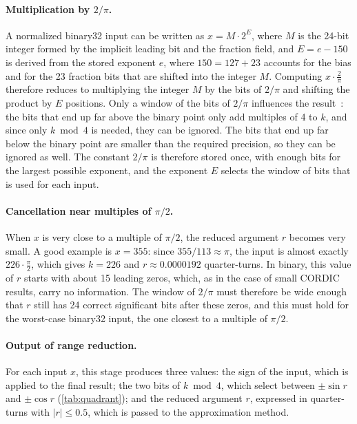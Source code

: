 \paragraph{Multiplication by $2/\pi$.}
A normalized binary32 input can be written as $x = M \cdot 2^{E}$, where $M$
is the 24-bit integer formed by the implicit leading bit and the fraction
field, and $E = e - 150$ is derived from the stored exponent $e$, where
$150 = 127 + 23$ accounts for the bias and for the 23 fraction bits that are
shifted into the integer $M$.
Computing $x \cdot \frac{2}{\pi}$ therefore reduces to multiplying the integer $M$ by
the bits of $2/\pi$ and shifting the product by $E$ positions. Only a window
of the bits of $2/\pi$ influences the result~\cite{ly2026payne}: the bits
that end up far above the binary point only add multiples of 4 to $k$, and
since only $k \bmod 4$ is needed, they can be ignored.
The bits that end up far below the binary point are smaller than the required precision, so they
can be ignored as well. The constant $2/\pi$ is therefore stored once, with
enough bits for the largest possible exponent, and the exponent $E$ selects
the window of bits that is used for each input.

\paragraph{Cancellation near multiples of $\pi/2$.}
When $x$ is very close to a multiple of $\pi/2$, the reduced argument $r$
becomes very small. A good example is $x = 355$: since
$355/113 \approx \pi$, the input is almost exactly $226 \cdot \frac{\pi}{2}$,
which gives $k = 226$ and $r \approx 0.0000192$ quarter-turns. In binary,
this value of $r$ starts with about 15 leading zeros, which, as in the case
of small CORDIC results, carry no information. The window of $2/\pi$ must
therefore be wide enough that $r$ still has 24 correct significant bits after
these zeros, and this must hold for the worst-case binary32 input, the one
closest to a multiple of $\pi/2$.

\paragraph{Output of range reduction.}
For each input $x$, this stage produces three values: the sign of the input,
which is applied to the final result; the two bits of $k \bmod 4$, which
select between $\pm\sin r$ and $\pm\cos r$ (\cref{tab:quadrant}); and the
reduced argument $r$, expressed in quarter-turns with $|r| \le 0.5$, which is
passed to the approximation method.

